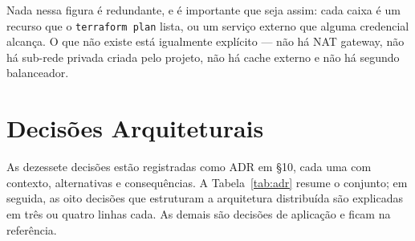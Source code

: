 \documentclass[11pt,a4paper]{article}
\begin{document}
Nada nessa figura é redundante, e é importante que seja assim: cada caixa é um recurso que o
\texttt{terraform plan} lista, ou um serviço externo que alguma credencial alcança. O que não existe
está igualmente explícito --- não há NAT gateway, não há sub-rede privada criada pelo projeto, não
há cache externo e não há segundo balanceador.

\section{Decisões Arquiteturais}

As dezessete decisões estão registradas como ADR em  §10, cada
uma com contexto, alternativas e consequências. A Tabela~\ref{tab:adr} resume o conjunto; em seguida,
as oito decisões que estruturam a arquitetura distribuída são explicadas em três ou quatro linhas
cada. As demais são decisões de aplicação e ficam na referência.
\end{document}
